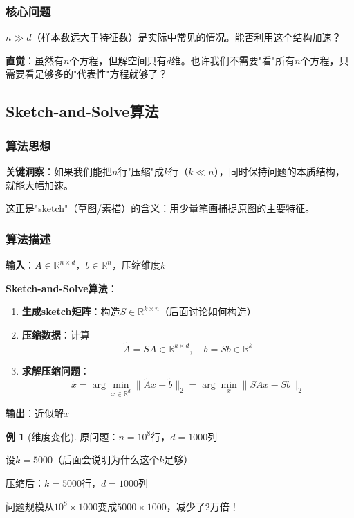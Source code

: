 \documentclass[11pt,a4paper]{ctexart}
\theoremstyle{definition}
\newtheorem{example}[theorem]{例}
\theoremstyle{remark}
\begin{document}
\subsubsection{核心问题}

$n \gg d$（样本数远大于特征数）是实际中常见的情况。能否利用这个结构加速？

\textbf{直觉}：虽然有$n$个方程，但解空间只有$d$维。也许我们不需要"看"所有$n$个方程，只需要看足够多的"代表性"方程就够了？


\subsection{Sketch-and-Solve算法}

\subsubsection{算法思想}

\textbf{关键洞察}：如果我们能把$n$行"压缩"成$k$行（$k \ll n$），同时保持问题的本质结构，就能大幅加速。

这正是"sketch"（草图/素描）的含义：用少量笔画捕捉原图的主要特征。

\subsubsection{算法描述}

\textbf{输入}：$A \in \mathbb{R}^{n \times d}$，$b \in \mathbb{R}^n$，压缩维度$k$

\textbf{Sketch-and-Solve算法}：
\begin{enumerate}
    \item \textbf{生成sketch矩阵}：构造$S \in \mathbb{R}^{k \times n}$（后面讨论如何构造）
    \item \textbf{压缩数据}：计算
    \[
    \tilde{A} = SA \in \mathbb{R}^{k \times d}, \quad \tilde{b} = Sb \in \mathbb{R}^k
    \]
    \item \textbf{求解压缩问题}：
    \[
    \tilde{x} = \arg\min_{x \in \mathbb{R}^d} \|\tilde{A}x - \tilde{b}\|_2 = \arg\min_{x} \|SAx - Sb\|_2
    \]
\end{enumerate}

\textbf{输出}：近似解$\tilde{x}$

\begin{example}[维度变化]
原问题：$n = 10^8$行，$d = 1000$列

设$k = 5000$（后面会说明为什么这个$k$足够）

压缩后：$k = 5000$行，$d = 1000$列

问题规模从$10^8 \times 1000$变成$5000 \times 1000$，减少了2万倍！
\end{example}
\end{document}

